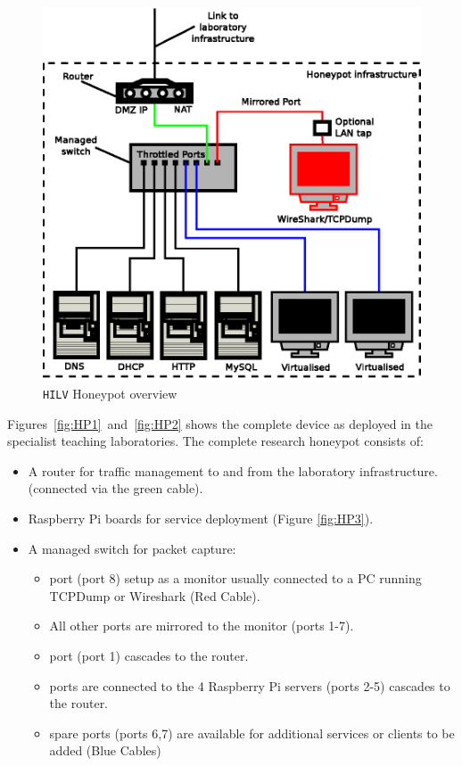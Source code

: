 \begin{figure}[!ht]
\begin{center}
	\includegraphics[scale=0.70]{Images/Honeypot1.eps}
\caption{\texttt{HILV} Honeypot overview}
\label{fig:HPOverview}
\end{center}
\end{figure}

Figures~\ref{fig:HP1}~and~\ref{fig:HP2} shows the complete device as deployed in the specialist teaching laboratories. The complete research honeypot consists of:

\begin{itemize}
\item \noindent A router for traffic management to and from the laboratory infrastructure. (connected via the green cable).
\item {} Raspberry Pi boards for service deployment (Figure \ref{fig:HP3}).
\item \noindent A managed switch for packet capture:
\begin{itemize}
	\item {} port (port 8) setup as a monitor usually connected to a PC running TCPDump or Wireshark (Red Cable).
	\item \noindent All other ports are mirrored to the monitor (ports 1-7). 
	\item {} port (port 1) cascades to the router. 
	\item {} ports are connected to the 4 Raspberry Pi servers (ports 2-5) cascades to the router. 
	\item {} spare ports (ports 6,7) are available for additional services or clients to be added (Blue Cables)
\end{itemize}
\end{itemize}

